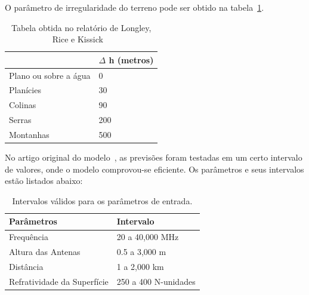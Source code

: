 O parâmetro de irregularidade do terreno pode ser obtido na tabela~\ref{table:deltah}.

\begin{table}[h]
\centering
\caption[Valores para o parâmetro de irregularidade do terreno.]
{Tabela obtida no relatório de Longley, Rice  e Kissick ~\cite{longleyricedelta}} 
\label{table:deltah}
\begin{tabular}{ll}

\hline
                             & $\Delta$ h (metros) \\ \hline
Plano ou sobre a água        & 0                 \\
Planícies                    & 30                \\
Colinas                      & 90                \\
Serras                       & 200               \\
Montanhas                    & 500               
\end{tabular}
\end{table}

No artigo original do modelo~\cite{longleyrice}, as previsões foram testadas em um certo intervalo de valores, onde o modelo comprovou-se eficiente. Os parâmetros e seus intervalos estão listados abaixo:

\begin{table}[h]
\centering
\caption[Intervalos válidos para os parâmetros de entrada.]
{Intervalos válidos para os parâmetros de entrada.}
\label{table:longleyricevaluesinterval}
\begin{tabular}{ll}
\hline
Parâmetros                  & Intervalo            \\ \hline
Frequência                  & 20 a 40,000 MHz      \\
Altura das Antenas          & 0.5 a 3,000 m        \\
Distância                   & 1 a 2,000 km         \\
Refratividade da Superfície & 250 a 400 N-unidades
\end{tabular}
\end{table}

